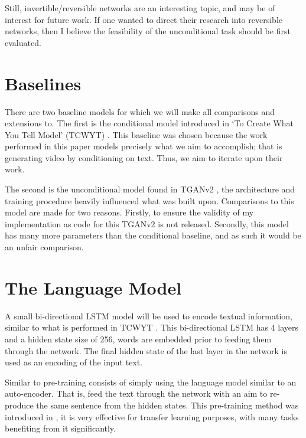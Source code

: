 \documentclass{report}
\theoremstyle{plain}
\theoremstyle{definition}
\theoremstyle{remark}
\numberwithin{equation}{section}
\numberwithin{figure}{section}
\newcommand{\<}{\langle}
\renewcommand{\>}{\rangle}
\begin{document}
Still, invertible/reversible networks are an interesting topic, and may be of interest for future work. If one wanted to direct their research into reversible networks, then I believe the feasibility of the unconditional task should be first evaluated.

\section{Baselines}

There are two baseline models for which we will make all comparisons and extensions to. The first is the conditional model introduced in `To Create What You Tell Model' (TCWYT) \cite{pan_create_2018}. This baseline was chosen because the work performed in this paper models precisely what we aim to accomplish; that is generating video by conditioning on text. Thus, we aim to iterate upon their work.

The second is the unconditional model found in TGANv2 \cite{saito_tganv2:_2018}, the architecture and training procedure heavily influenced what was built upon. Comparisons to this model are made for two reasons. Firstly, to ensure the validity of my implementation as code for this TGANv2 is not released. Secondly, this model has many more parameters than the conditional baseline, and as such it would be an unfair comparison.

\section{The Language Model}

A small bi-directional LSTM model will be used to encode textual information, similar to what is performed in TCWYT \cite{pan_create_2018}. This bi-directional LSTM has 4 layers and a hidden state size of 256, words are embedded prior to feeding them through the network. The final hidden state of the last layer in the network is used as an encoding of the input text.

Similar to \cite{pan_create_2018} pre-training consists of simply using the language model similar to an auto-encoder. That is, feed the text through the network with an aim to re-produce the same sentence from the hidden states. This pre-training method was introduced in \cite{dai_semi-supervised_2015}, it is very effective for transfer learning purposes, with many tasks benefiting from it significantly.
\end{document}
